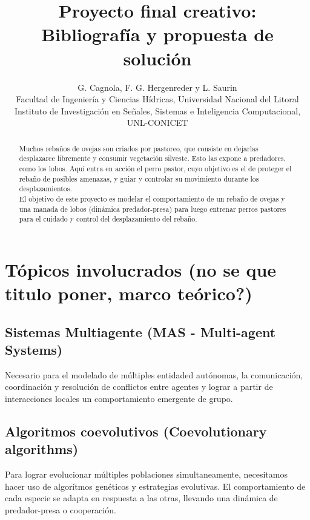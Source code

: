 \documentclass[final]{article}
\begin{document}
\def\tablename{Tabla}          %

\title{Proyecto final creativo:\\
    Bibliografía y propuesta de solución}

\author{G. Cagnola, F. G. Hergenreder y L. Saurin \\
        Facultad de Ingeniería y Ciencias Hídricas,
        Universidad Nacional del Litoral \\
        Instituto de Investigación en Señales, Sistemas e Inteligencia Computacional, UNL-CONICET}

\maketitle

\begin{abstract}
Muchos rebaños de ovejas son criados por pastoreo, que consiste en dejarlas desplazarce libremente y consumir vegetación silveste.
Esto las expone a predadores, como los lobos. Aquí entra en acción el perro pastor, cuyo objetivo es el de proteger el rebaño
de posibles amenazas, y guiar y controlar su movimiento durante los desplazamientos.\\
El objetivo de este proyecto es modelar el comportamiento de un rebaño de ovejas y una manada de lobos (dinámica predador-presa)
para luego entrenar perros pastores para el cuidado y control del desplazamiento del rebaño.
\end{abstract}

\section{Tópicos involucrados (no se que titulo poner, marco teórico?)}

\subsection{Sistemas Multiagente (MAS - Multi-agent Systems)}
Necesario para el modelado de múltiples entidaded autónomas, la comunicación, coordinación y resolución de conflictos entre agentes y
lograr a partir de interacciones locales un comportamiento emergente de grupo.

\subsection{Algoritmos coevolutivos (Coevolutionary algorithms)}
Para lograr evolucionar múltiples poblaciones simultaneamente, necesitamos hacer uso de algorítmos genéticos y estrategias evolutivas.
El comportamiento de cada especie se adapta en respuesta a las otras, llevando una dinámica de predador-presa o cooperación.
\end{document}
